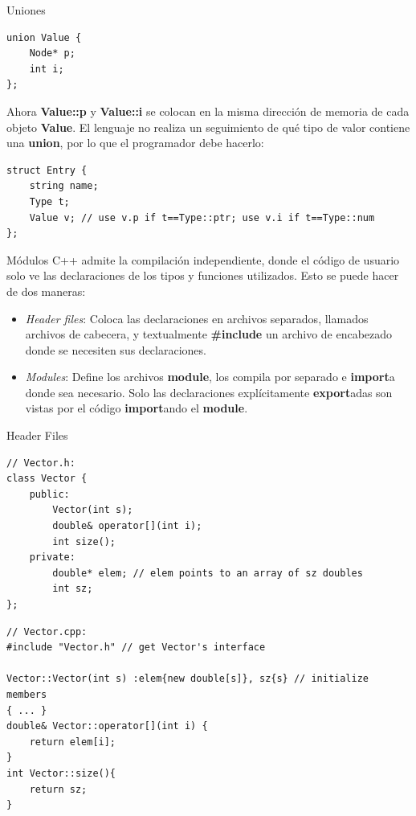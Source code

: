 \documentclass[11pt]{beamer}
\begin{document}
\begin{frame}[fragile]{Uniones}
\begin{lstlisting}
union Value {
	Node* p;
	int i;
};
\end{lstlisting}
\vspace{0.4cm}
\small
Ahora \textbf{Value::p} y \textbf{Value::i} se colocan en la misma dirección de memoria de cada objeto \textbf{Value}.
El lenguaje no realiza un seguimiento de qué tipo de valor contiene una \textbf{union}, por lo que el programador debe hacerlo:
\vspace{0.4cm}
\begin{lstlisting}
struct Entry {
	string name;
	Type t;
	Value v; // use v.p if t==Type::ptr; use v.i if t==Type::num
};
\end{lstlisting}	
\end{frame}

\begin{frame}{Módulos}
\small
C++ admite la compilación independiente, donde el código de usuario solo ve las declaraciones de los tipos y funciones utilizados. Esto se puede hacer de dos maneras:
\begin{itemize}
	\item \textit{Header files}: Coloca las declaraciones en archivos separados, llamados archivos de cabecera, y textualmente \textbf{\#include} un archivo de encabezado donde se necesiten sus declaraciones.
	\item \textit{Modules}: Define los archivos \textbf{module}, los compila por separado e \textbf{import}a donde sea necesario. Solo las declaraciones explícitamente \textbf{export}adas son vistas por el código \textbf{import}ando el \textbf{module}.	
\end{itemize}

\end{frame}

\begin{frame}[fragile]{Header Files}
	\small
\begin{lstlisting}
// Vector.h:
class Vector {
	public:
		Vector(int s);
		double& operator[](int i);
		int size();
	private:
		double* elem; // elem points to an array of sz doubles
		int sz;
};	
\end{lstlisting}
%
\begin{lstlisting}
// Vector.cpp:
#include "Vector.h" // get Vector's interface

Vector::Vector(int s) :elem{new double[s]}, sz{s} // initialize members
{ ... }
double& Vector::operator[](int i) {
	return elem[i];
}
int Vector::size(){
	return sz;
}	
\end{lstlisting}
\end{frame}
\end{document}
